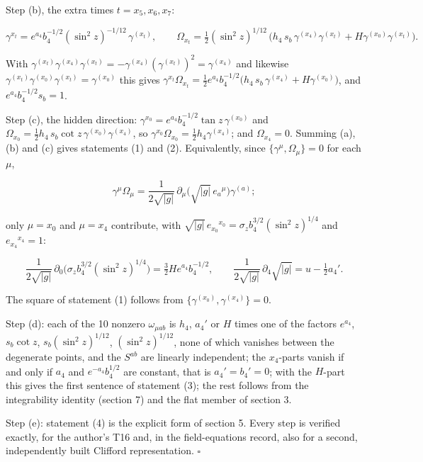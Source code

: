 \documentclass[11pt]{article}
\begin{document}
Step (b), the extra times $t = x_5, x_6, x_7$:

\[
\gamma^{x_t} = e^{a_4}b_4^{-1/2}(\sin^2 z)^{-1/12}\,\gamma^{(x_t)}, \qquad \Omega_{x_t} = \tfrac12(\sin^2 z)^{1/12}\,\big(h_4\,s_b\,\gamma^{(x_4)}\gamma^{(x_t)} + H\gamma^{(x_0)}\gamma^{(x_t)}\big) .
\]

With $\gamma^{(x_t)}\gamma^{(x_4)}\gamma^{(x_t)} = -\gamma^{(x_4)}(\gamma^{(x_t)})^2 = \gamma^{(x_4)}$ and likewise $\gamma^{(x_t)}\gamma^{(x_0)}\gamma^{(x_t)} = \gamma^{(x_0)}$ this gives $\gamma^{x_t}\Omega_{x_t} = \tfrac12e^{a_4}b_4^{-1/2}\big(h_4\,s_b\,\gamma^{(x_4)} + H\gamma^{(x_0)}\big)$, and $e^{a_4}b_4^{-1/2}s_b = 1$.

Step (c), the hidden direction: $\gamma^{x_0} = e^{a_4}b_4^{-1/2}\tan z\,\gamma^{(x_0)}$ and $\Omega_{x_0} = \tfrac12h_4\,s_b\cot z\,\gamma^{(x_0)}\gamma^{(x_4)}$, so $\gamma^{x_0}\Omega_{x_0} = \tfrac12h_4\gamma^{(x_4)}$; and $\Omega_{x_4} = 0$. Summing (a), (b) and (c) gives statements (1) and (2). Equivalently, since $\{\gamma^\mu, \Omega_\mu\} = 0$ for each $\mu$,

\[
\gamma^\mu\Omega_\mu = \frac{1}{2\sqrt{|g|}}\,\partial_\mu\big(\sqrt{|g|}\,e_a{}^\mu\big)\gamma^{(a)} ;
\]

only $\mu = x_0$ and $\mu = x_4$ contribute, with $\sqrt{|g|}\,e_{x_0}{}^{x_0} = \sigma_z b_4^{3/2}(\sin^2 z)^{1/4}$ and $e_{x_4}{}^{x_4} = 1$:

\[
\frac{1}{2\sqrt{|g|}}\,\partial_0\big(\sigma_z b_4^{3/2}(\sin^2 z)^{1/4}\big) = \tfrac32He^{a_4}b_4^{-1/2}, \qquad \frac{1}{2\sqrt{|g|}}\,\partial_4\sqrt{|g|} = u - \tfrac12a_4' .
\]

The square of statement (1) follows from $\{\gamma^{(x_0)}, \gamma^{(x_4)}\} = 0$.

Step (d): each of the 10 nonzero $\omega_{\mu ab}$ is $h_4$, $a_4'$ or $H$ times one of the factors $e^{a_4}$, $s_b\cot z$, $s_b(\sin^2 z)^{1/12}$, $(\sin^2 z)^{1/12}$, none of which vanishes between the degenerate points, and the $S^{ab}$ are linearly independent; the $x_4$-parts vanish if and only if $a_4$ and $e^{-a_4}b_4^{1/2}$ are constant, that is $a_4' = b_4' = 0$; with the $H$-part this gives the first sentence of statement (3); the rest follows from the integrability identity (section 7) and the flat member of section 3.

Step (e): statement (4) is the explicit form of section 5. Every step is verified exactly, for the author's T16 and, in the field-equations record, also for a second, independently built Clifford representation. $\square$
\end{document}
